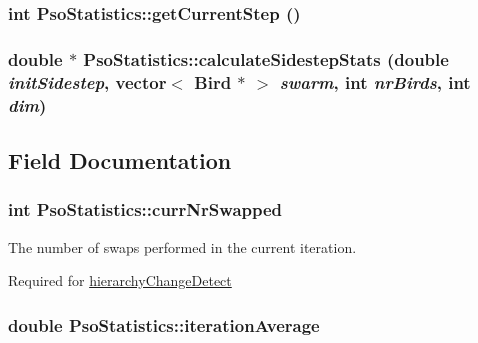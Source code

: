 \hypertarget{classPsoStatistics_7f0b1661dfa4627c0e2e15020ab6b83e}{
\subsubsection{\setlength{\rightskip}{0pt plus 5cm}int PsoStatistics::getCurrentStep ()}}
\label{classPsoStatistics_7f0b1661dfa4627c0e2e15020ab6b83e}


\hypertarget{classPsoStatistics_ac6c4899720fbe600b094ad171839f9d}{
\subsubsection{\setlength{\rightskip}{0pt plus 5cm}double $\ast$ PsoStatistics::calculateSidestepStats (double {\em initSidestep}, \/  vector$<$ {\bf Bird} $\ast$ $>$ {\em swarm}, \/  int {\em nrBirds}, \/  int {\em dim})}}
\label{classPsoStatistics_ac6c4899720fbe600b094ad171839f9d}




\subsection{Field Documentation}
\hypertarget{classPsoStatistics_5044b5ce808f338d3b4048db731ccc2a}{
\subsubsection{\setlength{\rightskip}{0pt plus 5cm}int {\bf PsoStatistics::currNrSwapped}}}
\label{classPsoStatistics_5044b5ce808f338d3b4048db731ccc2a}


The number of swaps performed in the current iteration. 

Required for \hyperlink{pso_8h_ea087f59f65df7bbf4798bccd8a0241614e6414cc28d2d7ed30881a1cc02c4db}{hierarchyChangeDetect} \hypertarget{classPsoStatistics_12fc174bcbad0248b48a356cf3304b29}{
\subsubsection{\setlength{\rightskip}{0pt plus 5cm}double {\bf PsoStatistics::iterationAverage}}}
\label{classPsoStatistics_12fc174bcbad0248b48a356cf3304b29}


